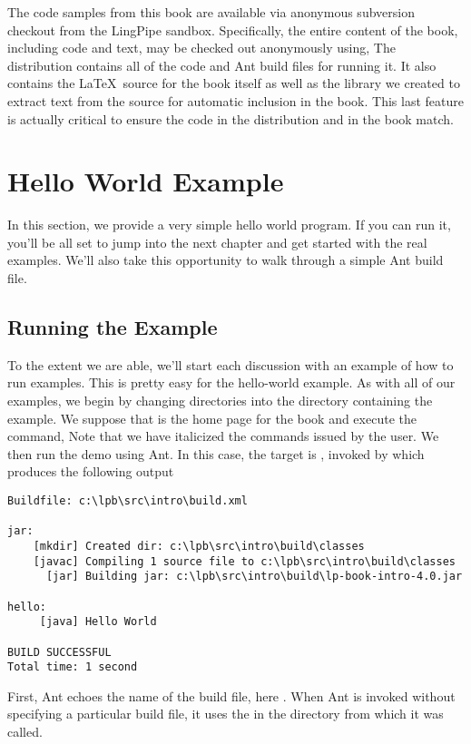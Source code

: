 The code samples from this book are available via anonymous subversion checkout
from the LingPipe sandbox.  Specifically, the entire content of the book,
including code and text, may be checked out anonymously using,
%
%
The distribution contains all of the code and Ant build files for
running it.  It also contains the \LaTeX\ source for the book itself
as well as the library we created to extract text from the source for
automatic inclusion in the book.  This last feature is actually
critical to ensure the code in the distribution and in the book match.  


\section{Hello World Example}

In this section, we provide a very simple hello world program.  If you
can run it, you'll be all set to jump into the next chapter and get
started with the real examples.  We'll also take this opportunity to
walk through a simple Ant build file.

\subsection{Running the Example}

To the extent we are able, we'll start each discussion with an example
of how to run examples.  This is pretty easy for the hello-world
example.  As with all of our examples, we begin by changing
directories into the directory containing the example.  We suppose
that \relpath{} is the home page for the book and execute the
 command,
%
%
Note that we have italicized the commands issued by the user.
%
We then run the demo using Ant.  In this case, the target is ,
invoked by
%
%
which produces the following output
%
\begin{verbatim}
Buildfile: c:\lpb\src\intro\build.xml

jar:
    [mkdir] Created dir: c:\lpb\src\intro\build\classes
    [javac] Compiling 1 source file to c:\lpb\src\intro\build\classes
      [jar] Building jar: c:\lpb\src\intro\build\lp-book-intro-4.0.jar

hello:
     [java] Hello World

BUILD SUCCESSFUL
Total time: 1 second
\end{verbatim}
%
First, Ant echoes the name of the build file, here
.  When Ant is
invoked without specifying a particular build file, it uses the
 in the directory from which it was called.  


